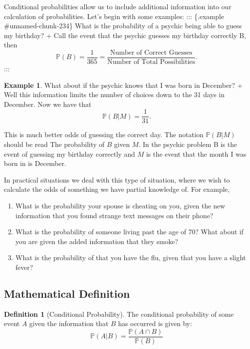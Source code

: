 \documentclass[
]{book}
\newcommand{\prob}[1]{{\mathbb{P}(#1)}}
\theoremstyle{definition}
\newtheorem{definition}{Definition}[chapter]
\theoremstyle{definition}
\newtheorem{example}{Example}[chapter]
\theoremstyle{definition}
\theoremstyle{definition}
\theoremstyle{remark}
\begin{document}
Conditional probabilities allow us to include additional information into our calculation of probabilities. Let's begin with some examples:
::: \{.example \#unnamed-chunk-234\}
What is the probability of a psychic being able to guess my birthday?
+ Call the event that the psychic guesses my birthday correctly B, then \[\prob{B}=\frac{1}{365}=\frac{\text{Number of Correct Guesses}}{\text{Number of Total Possibilities}}.\]
:::

\begin{example}
\protect\hypertarget{exm:unnamed-chunk-235}{}\label{exm:unnamed-chunk-235}What about if the psychic knows that I was born in December?
+ Well this information limits the number of choices down to the 31 days in December. Now we have that
\[\prob{B|M}=\frac{1}{31}.\]
\end{example}

This is much better odds of guessing the correct day. The notation \(\prob{B|M}\) should be read The probability of \(B\) given \(M\). In the psychic problem B is the event of guessing my birthday correctly and \(M\) is the event that the month I was born in is December.

In practical situations we deal with this type of situation, where we wish to calculate the odds of something we have partial knowledge of. For example,

\begin{enumerate}
\def\labelenumi{\arabic{enumi}.}
\item
  What is the probability your spouse is cheating on you, given the new information that you found strange text messages on their phone?
\item
  What is the probability of someone living past the age of 70? What about if you are given the added information that they smoke?
\item
  What is the probability of that you have the flu, given that you have a slight fever?
\end{enumerate}

\hypertarget{mathematical-definition}{%
\subsection{Mathematical Definition}\label{mathematical-definition}}

\begin{definition}[Conditional Probability]
\protect\hypertarget{def:unnamed-chunk-236}{}\label{def:unnamed-chunk-236}The conditional probability of some event \(A\) given the information that \(B\) has occurred is given by: \[\prob{A|B}=\frac{\prob{A \cap B}}{\prob{B}}\]
\end{definition}
\end{document}
